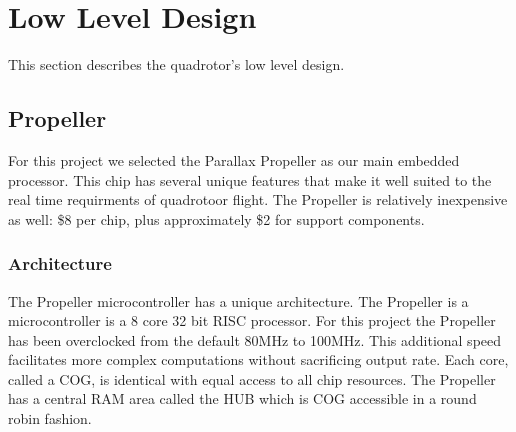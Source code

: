 \documentclass{article}
\numberwithin{equation}{section} %
\begin{document}



\section{Low Level Design}
This section describes the quadrotor's low level design.
\subsection{Propeller}
For this project we selected the Parallax Propeller as our main embedded processor. This chip has several unique features that make it well suited to the real time requirments of quadrotoor flight. The Propeller is relatively inexpensive as well: \$8 per chip, plus approximately \$2 for support components.

\subsubsection{Architecture}

The Propeller microcontroller has a unique architecture. The Propeller is a microcontroller is a 8 core 32 bit RISC processor. For this project the Propeller has been overclocked from the default 80MHz to 100MHz. This additional speed facilitates more complex computations without sacrificing output rate. Each core, called a COG, is identical with equal access to all chip resources. The Propeller has a central RAM area called the HUB which is COG accessible in a round robin fashion.
\end{document}
